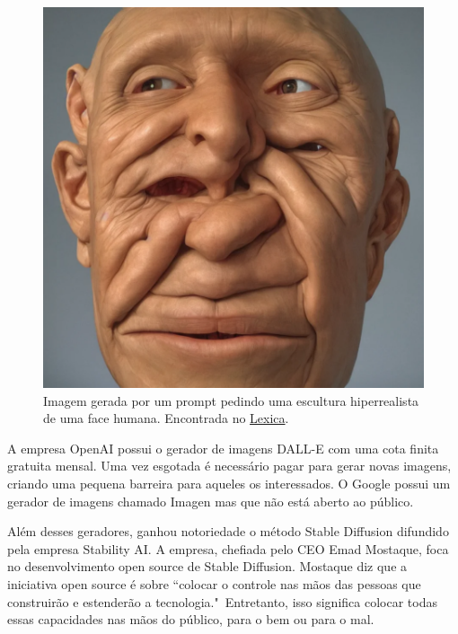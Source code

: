 \begin{figure}
    \centering 
    \includegraphics[scale=0.24]{face_deformada.png}
    \caption{Imagem gerada por um prompt pedindo uma escultura hiperrealista de uma face humana. Encontrada no \href{https://lexica.art/prompt/10023e09-97d2-4ba3-8e01-4ee149a42c6f}{Lexica}.}
    \label{fig:deformed_face}
  \end{figure}


A empresa OpenAI possui o gerador de imagens DALL-E com uma cota finita gratuita mensal. Uma vez esgotada é necessário pagar para gerar novas imagens, criando uma pequena barreira para aqueles os interessados. O Google possui um gerador de imagens chamado Imagen mas que não está aberto ao público.



Além desses geradores, ganhou notoriedade o método Stable Diffusion difundido pela empresa Stability AI. A empresa, chefiada pelo CEO Emad Mostaque, foca no desenvolvimento open source de Stable Diffusion. Mostaque diz que a iniciativa open source é sobre ``colocar o controle nas mãos das pessoas que construirão e estenderão a tecnologia."\, Entretanto, isso significa colocar todas essas capacidades nas mãos do público, para o bem ou para o mal.



